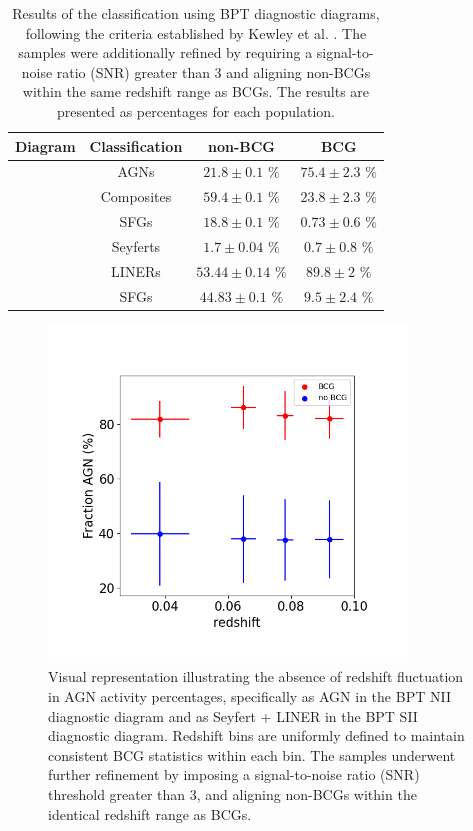 \begin{table}[htb]
  \centering
  \begin{tabular}{cccc}
    \hline\hline
    \multicolumn{1}{c}{Diagram} & Classification & non-BCG & BCG \\
    \hline
    [NII]  & AGNs & $21.8 \pm 0.1$ $\%$ & $75.4 \pm 2.3$ $\%$ \\
           & Composites & $59.4 \pm 0.1$ $\%$ &  $23.8 \pm 2.3$ $\%$ \\
           & SFGs & $18.8 \pm 0.1$ $\%$ &  $0.73 \pm 0.6$ $\%$ \\ 
    \hline
    [SII]  & Seyferts & $1.7 \pm 0.04$ $\%$  & $0.7 \pm 0.8$ $\%$\\
           & LINERs & $53.44 \pm 0.14$ $\%$  & $89.8 \pm 2$ $\%$\\
           & SFGs &$44.83 \pm 0.1$ $\%$  & $9.5 \pm 2.4$ $\%$\\
    \hline\hline
  \end{tabular}
  \caption{Results of the classification using BPT diagnostic diagrams, following the criteria established by Kewley et al. \cite{2006MNRAS.372..961K}. The samples were additionally refined by requiring a signal-to-noise ratio (SNR) greater than 3 and aligning non-BCGs within the same redshift range as BCGs. The results are presented as percentages for each population. }
  \label{tab:Optical2}
\end{table}

\begin{figure}[t]
  \centering
  \includegraphics[width=0.85\textwidth]{Fraction_z}
  \caption{Visual representation illustrating the absence of redshift fluctuation in AGN activity percentages, specifically as AGN in the BPT NII diagnostic diagram and as Seyfert + LINER in the BPT SII diagnostic diagram. Redshift bins are uniformly defined to maintain consistent BCG statistics within each bin. The samples underwent further refinement by imposing a signal-to-noise ratio (SNR) threshold greater than 3, and aligning non-BCGs within the identical redshift range as BCGs.}
  \label{IMG:frac_z}
\end{figure}

